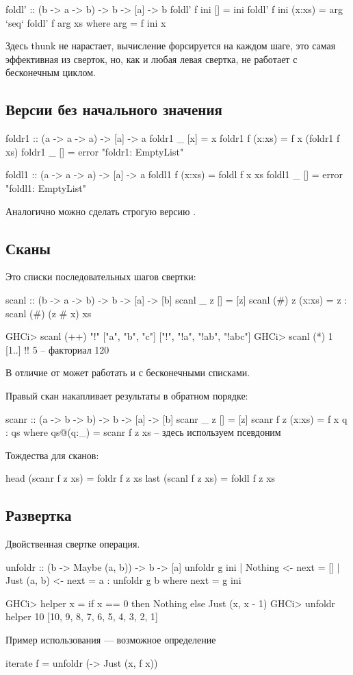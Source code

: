 \documentclass[11pt,a4paper]{article}
\begin{document}
\begin{hscode}
foldl' :: (b -> a -> b) -> b -> [a] -> b
foldl' f ini [] = ini
foldl' f ini (x:xs) = arg `seq` foldl' f arg xs
                        where arg = f ini x
\end{hscode}
Здесь thunk не нарастает, вычисление  форсируется на каждом шаге, это самая эффективная из сверток, но, как и любая левая свертка, не работает с бесконечным циклом.

\subsection{Версии без начального значения}
\begin{hscode}
foldr1 :: (a -> a -> a) -> [a] -> a
foldr1 _ [x] = x
foldr1 f (x:xs) = f x (foldr1 f xs)
foldr1 _ [] = error "foldr1: EmptyList"
\end{hscode}
\begin{hscode}
foldl1 :: (a -> a -> a) -> [a] -> a
foldl1 f (x:xs) = foldl f x xs
foldl1 _ [] = error "foldl1: EmptyList"
\end{hscode}
Аналогично можно сделать строгую версию .

 \subsection{Сканы}
Это списки последовательных шагов свертки:
\begin{hscode}
scanl :: (b -> a -> b) -> b -> [a] -> [b]
scanl _ z [] = [z]
scanl (#) z (x:xs) = z : scanl (#) (z # x) xs

GHCi> scanl (++) "!" ["a", "b", "c"]
["!", "!a", "!ab", "!abc"]
GHCi> scanl (*) 1 [1..] !! 5 -- факториал
120
\end{hscode}
В отличие от  может работать и с бесконечными списками.

\noindent Правый скан накапливает результаты в обратном порядке:
\begin{hscode}
scanr :: (a -> b -> b) -> b -> [a] -> [b]
scanr _ z [] = [z]
scanr f z (x:xs) = f x q : qs
                     where qs@(q:_) = scanr f z xs  -- здесь используем псевдоним
\end{hscode}
Тождества для сканов:
\begin{hscode}
head (scanr f z xs) = foldr f z xs
last (scanl f z xs) = foldl f z xs
\end{hscode}
\subsection{Развертка}
Двойственная свертке операция.
\begin{hscode}
unfoldr :: (b -> Maybe (a, b)) -> b -> [a]
unfoldr g ini 
  | Nothing     <- next = []
  | Just (a, b) <- next = a : unfoldr g b
  where next = g ini

GHCi> helper x = if x == 0 then Nothing else Just (x, x - 1)
GHCi> unfoldr helper 10
[10, 9, 8, 7, 6, 5, 4, 3, 2, 1]
\end{hscode}
Пример использования --- возможное определение 
\begin{hscode}
iterate f = unfoldr (\x -> Just (x, f x))
\end{hscode}
\end{document}
